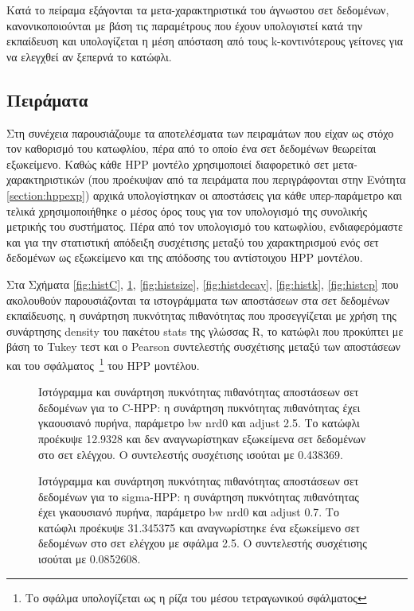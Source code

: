 Κατά το πείραμα εξάγονται τα μετα-χαρακτηριστικά του άγνωστου σετ δεδομένων, κανονικοποιούνται  με βάση τις παραμέτρους που έχουν υπολογιστεί κατά την εκπαίδευση και υπολογίζεται η μέση απόσταση από τους k-κοντινότερους γείτονες για να ελεγχθεί αν ξεπερνά το κατώφλι.

\subsection{Πειράματα}
Στη συνέχεια παρουσιάζουμε τα αποτελέσματα των πειραμάτων που είχαν ως στόχο τον καθορισμό του κατωφλίου, πέρα από το οποίο ένα σετ δεδομένων θεωρείται εξωκείμενο. Καθώς κάθε \gls{HPP} μοντέλο χρησιμοποιεί διαφορετικό σετ μετα-χαρακτηριστικών (που προέκυψαν από τα πειράματα που περιγράφονται στην Ενότητα \ref{section:hppexp}) αρχικά υπολογίστηκαν οι αποστάσεις για κάθε υπερ-παράμετρο και τελικά χρησιμοποιήθηκε ο μέσος όρος τους για τον υπολογισμό της συνολικής μετρικής του συστήματος. Πέρα από τον υπολογισμό του κατωφλίου, ενδιαφερόμαστε και για την στατιστική απόδειξη συσχέτισης μεταξύ του χαρακτηρισμού ενός σετ δεδομένων ως εξωκείμενο και της απόδοσης του αντίστοιχου HPP μοντέλου.

Στα Σχήματα \ref{fig:histC}, \ref{fig:histsigma}, \ref{fig:histsize}, \ref{fig:histdecay}, \ref{fig:histk}, \ref{fig:histcp} που ακολουθούν παρουσιάζονται τα ιστογράμματα των αποστάσεων στα σετ δεδομένων εκπαίδευσης, η συνάρτηση πυκνότητας πιθανότητας που προσεγγίζεται με χρήση της συνάρτησης density του πακέτου stats της γλώσσας R, το κατώφλι που προκύπτει με βάση το Tukey τεστ και ο Pearson συντελεστής συσχέτισης μεταξύ των αποστάσεων και του σφάλματος~\footnote{Το σφάλμα υπολογίζεται ως η ρίζα του μέσου τετραγωνικού σφάλματος} του HPP μοντέλου.


\begin{figure}[!htb]
	\begin{minipage}{0.45\textwidth}
		\centering
		\scalebox{0.35}{
			}
		\caption[Ιστόγραμμα και συνάρτηση πυκνότητας πιθανότητας αποστάσεων σετ δεδομένων για το C-HPP]{Ιστόγραμμα και συνάρτηση πυκνότητας πιθανότητας αποστάσεων σετ δεδομένων για το C-HPP: η συνάρτηση πυκνότητας πιθανότητας έχει γκαουσιανό πυρήνα, παράμετρο bw nrd0 και adjust 2.5. Το κατώφλι προέκυψε 12.9328 και δεν αναγνωρίστηκαν εξωκείμενα σετ δεδομένων στο σετ ελέγχου. Ο συντελεστής συσχέτισης ισούται με 0.438369.}
		\label{fig:histC}
	\end{minipage} \hfill
	\begin{minipage}{0.45\textwidth}
		\centering
		\scalebox{0.35}{
			}
		\caption[Ιστόγραμμα και συνάρτηση πυκνότητας πιθανότητας αποστάσεων σετ δεδομένων για το sigma-HPP]{Ιστόγραμμα και συνάρτηση πυκνότητας πιθανότητας αποστάσεων σετ δεδομένων για το sigma-HPP: η συνάρτηση πυκνότητας πιθανότητας έχει γκαουσιανό πυρήνα, παράμετρο bw nrd0 και adjust 0.7. Το κατώφλι προέκυψε 31.345375 και αναγνωρίστηκε ένα εξωκείμενο σετ δεδομένων στο σετ ελέγχου με σφάλμα 2.5. Ο συντελεστής συσχέτισης ισούται με 0.0852608.}
		\label{fig:histsigma}
	\end{minipage}
\end{figure}


